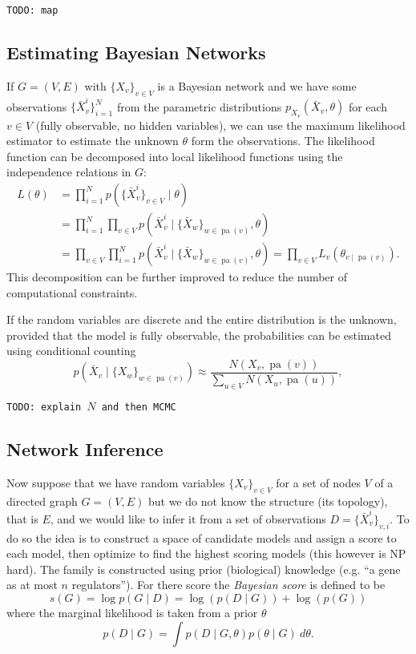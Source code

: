 \documentclass[a4paper]{article}
\newcommand{\todo}[1]{\texttt{TODO: #1}}
\newcommand{\given}{\mid}
\DeclareMathOperator{\pa}{pa} %
\theoremstyle{plain}
\theoremstyle{definition}
\theoremstyle{remark}
\begin{document}
\todo{map}

\subsection{Estimating Bayesian Networks}

If $G = (V,E)$ with $\{X_v\}_{v \in V}$ is a Bayesian network and we have some
observations $\{\bar{X}_v^i\}_{i=1}^N$ from the parametric distributions
$p_{X_v}(\bar{X}_v, \theta)$ for each $v \in V$ (fully observable, no hidden
variables), we can use the maximum likelihood estimator to estimate the
unknown $\theta$ form the observations. The likelihood function can be
decomposed into local likelihood functions using the independence relations in
$G$:
\begin{align*}
  L(\theta) &= \prod_{i=1}^N p(\{\bar{X}_v^i\}_{v \in V} \given \theta) \\
    &= \prod_{i=1}^N \prod_{v \in V}  p(
      \bar{X}_v^i \given
      \{\bar{X}_w\}_{w \in \pa(v)}, \theta) \\
    &= \prod_{v \in V} \prod_{i=1}^N
        p(\bar{X}_v^i \given \{\bar{X}_w\}_{w \in \pa(v)}, \theta) 
    = \prod_{v \in V} L_v(\theta_{v \given \pa(v)}).
\end{align*}
This decomposition can be further improved to reduce the number of
computational constraints.

If the random variables are discrete and the entire distribution is the
unknown, provided that the model is fully observable, the probabilities can be
estimated using conditional counting
\[
  p(\bar{X}_v \given \{X_w\}_{w \in \pa(v)}) \approx
    \frac{N(X_v, \pa(v))}{\sum_{u \in V} N(X_u, \pa(u))},
\]

\todo{explain $N$ and then MCMC}

\subsection{Network Inference}

Now suppose that we have random variables $\{X_v\}_{v \in V}$ for a set of
nodes $V$ of a directed graph $G = (V,E)$ but we do not know the structure
(its topology), that is $E$, and we would like to infer it from a set of
observations $D = \{\bar{X}_v^i\}_{v,i}$. To do so the idea is to construct a
space of candidate models and assign a score to each model, then optimize to
find the highest scoring models (this however is NP hard). The family is
constructed using prior (biological) knowledge (e.g. ``a gene as at most $n$
regulators''). For there score the \emph{Bayesian score} is defined to be
\[
  s(G) = \log p(G \given D) = \log(p(D \given G)) + \log(p(G))
\]
where the marginal likelihood is taken from a prior $\theta$
\[
  p(D \given G) = \int p(D \given G, \theta) p(\theta \given G) ~ d\theta.
\]
\end{document}
